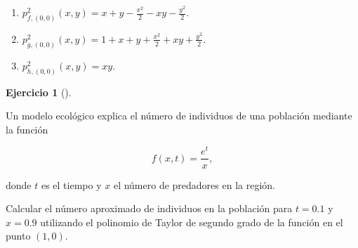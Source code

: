 \documentclass[
  a4paper,
]{scrreport}
\theoremstyle{definition}
\newtheorem{exercise}{Ejercicio}[chapter]
\theoremstyle{remark}
\begin{document}
\begin{tcolorbox}[enhanced jigsaw, coltitle=black, toptitle=1mm, colframe=quarto-callout-tip-color-frame, colbacktitle=quarto-callout-tip-color!10!white, breakable, opacityback=0, bottomtitle=1mm, opacitybacktitle=0.6, title=\textcolor{quarto-callout-tip-color}{\faLightbulb}\hspace{0.5em}{Solución}, arc=.35mm, leftrule=.75mm, toprule=.15mm, titlerule=0mm, bottomrule=.15mm, left=2mm, rightrule=.15mm, colback=white]

\begin{enumerate}
\def\labelenumi{\alph{enumi}.}
\item
  \(p^2_{f,(0,0)}(x,y) = x + y -\frac{x^2}{2} - xy -\frac{y^2}{2}\).
\item
  \(p^2_{g,(0,0)}(x,y) = 1 + x + y +\frac{x^2}{2} + xy +\frac{y^2}{2}\).
\item
  \(p^2_{h,(0,0)}(x,y) = xy\).
\end{enumerate}

\end{tcolorbox}

\begin{exercise}[]\protect\hypertarget{exr-polinomio-taylor-modelo-ecologico}{}\label{exr-polinomio-taylor-modelo-ecologico}

Un modelo ecológico explica el número de individuos de una población
mediante la función

\[f(x,t)=\dfrac{e^t}{x},\]

donde \(t\) es el tiempo y \(x\) el número de predadores en la región.

Calcular el número aproximado de individuos en la población para
\(t=0.1\) y \(x=0.9\) utilizando el polinomio de Taylor de segundo grado
de la función en el punto \((1,0)\).

\end{exercise}
\end{document}
